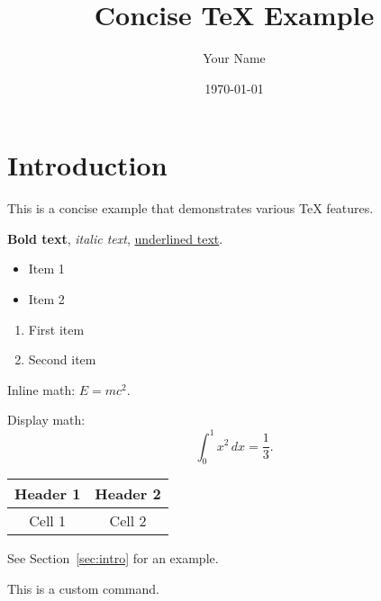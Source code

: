 \documentclass{article}
\title{Concise TeX Example}
\author{Your Name}
\date{\today}
\begin{document}
\maketitle

\section{Introduction}

This is a concise example that demonstrates various TeX features.

\textbf{Bold text}, \textit{italic text}, \underline{underlined text}.

\begin{itemize}
    \item Item 1
    \item Item 2
\end{itemize}

\begin{enumerate}
    \item First item
    \item Second item
\end{enumerate}

Inline math: $E=mc^2$.

Display math:
\[
\int_{0}^{1} x^2 \,dx = \frac{1}{3}.
\]

\begin{tabular}{|c|c|}
    \hline
    Header 1 & Header 2 \\
    \hline
    Cell 1 & Cell 2 \\
    \hline
\end{tabular}

See Section~\ref{sec:intro} for an example.

\newcommand{\mycommand}{This is a custom command.}

\mycommand

\end{document}
